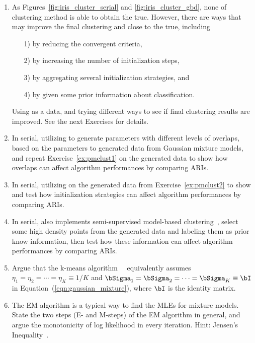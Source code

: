 \begin{enumerate}[label=\thechapter-\arabic*]

\item
As Figures~\ref{fig:iris_cluster_serial} and \ref{fig:iris_cluster_gbd},
none of clustering method is able to obtain the true. However, there are
ways that may improve the final clustering and close to the true, including
\begin{itemize}
\item[1)] by reducing the convergent criteria,
\item[2)] by increasing the number of initialization steps,
\item[3)] by aggregating several initialization strategies, and
\item[4)] by given some prior information about classification.
\end{itemize}
Using  as a data, and trying different ways to see if
final clustering results are improved.
See the next Exercises for details.
\label{ex:pmclust1}

\item
In serial,
utilizing  to generate parameters with different levels of
overlaps, based on the parameters to generated data from Gaussian mixture
models, and repeat Exercise~\ref{ex:pmclust1} on the generated data
to show how overlaps can affect algorithm performances by comparing ARIs.
\label{ex:pmclust2}

\item
In serial,
utilizing  on the generated data from Exercise~\ref{ex:pmclust2}
to show and test how initialization strategies can affect algorithm
performances by comparing ARIs.

\item
In serial,
 also implements semi-supervised model-based
clustering~, select some high density points
from the generated data and labeling them as prior know information, then
test how these information can affect algorithm performances
by comparing ARIs.

\item
Argue that the k-means algorithm~\citep{Forgy1965}~
equivalently assumes
$\eta_1 = \eta_2 = \cdots = \eta_K \equiv 1/K$ and
$\bSigma_1 = \bSigma_2 = \cdots = \bSigma_K \equiv \bI$
in Equation~(\ref{eqn:gaussian_mixture}), where
$\bI$ is the identity matrix.

\item
The EM algorithm is a typical way to find the MLEs for mixture models.
State the two steps (E- and M-steps) of the EM algorithm in general,
and argue the monotonicity of log likelihood in every iteration.
{\color{blue} Hint: Jensen's Inequality~\citep{Jensen1906}.}


\end{enumerate}

